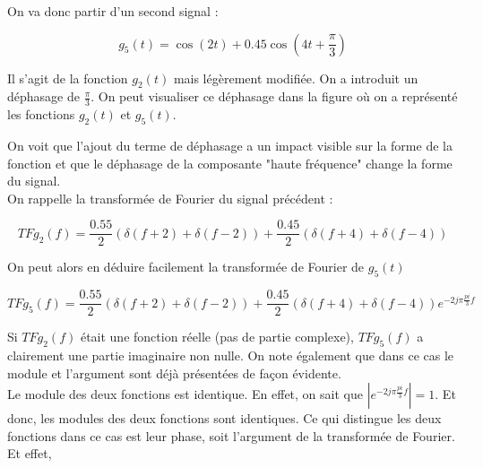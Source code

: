 \documentclass[11pt,a4paper]{article}
\begin{document}
On va donc partir d'un second signal :

\[ g_5(t) = \cos(2 t) + 0.45 \cos(4 t + \frac{\pi}{3}) \] 

Il s'agit de la fonction $g_2(t)$ mais légèrement modifiée. On a introduit un déphasage de $\frac{\pi}{3}$. On peut visualiser ce déphasage dans la figure où on a représenté les fonctions $g_2(t)$ et $g_5(t)$.


\begin{center}
\end{center}
On voit que l'ajout du terme de déphasage a un impact visible sur la forme de la fonction et que le déphasage de la composante "haute fréquence" change la forme du signal.\\

On rappelle la transformée de Fourier du signal précédent :

\[ TF{g_2}(f) =   \frac{0.55}{2}(\delta(f+2) + \delta(f-2)) + \frac{0.45}{2}(\delta(f+4) + \delta(f-4))\]

On peut alors en déduire facilement la transformée de Fourier de $g_5(t)$

\[ TF{g_5}(f) =   \frac{0.55}{2}(\delta(f+2) + \delta(f-2)) + \frac{0.45}{2}(\delta(f+4) + \delta(f-4))e^{-2 j \pi \frac{pi}{3} f }\]

Si $TF{g_2}(f)$ était une fonction réelle (pas de partie complexe), $TF{g_5}(f)$ a clairement une partie imaginaire non nulle. On note également que dans ce cas le module et l'argument sont déjà présentées de façon évidente.\\

Le module des deux fonctions est identique. En effet, on sait que $|e^{-2 j \pi \frac{pi}{3} f }|=1$. Et donc, les modules des deux fonctions sont identiques. Ce qui distingue les deux fonctions dans ce cas est leur phase, soit l'argument de la transformée de Fourier.  Et effet, 
\end{document}
